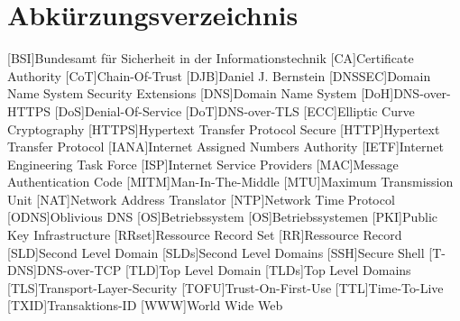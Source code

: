 \documentclass[Bachelor, BIC, german]{twbook}
\begin{document}
\chapter*{Abkürzungsverzeichnis}
\begin{acronym}[XXXXXX]
    [BSI]{Bundesamt für Sicherheit in der Informationstechnik}
    [CA]{Certificate Authority}
    [CoT]{Chain-Of-Trust}
    [DJB]{Daniel J. Bernstein}
    [DNSSEC]{Domain Name System Security Extensions}
    [DNS]{Domain Name System}
    [DoH]{DNS-over-HTTPS}
    [DoS]{Denial-Of-Service}
    [DoT]{DNS-over-TLS}
    [ECC]{Elliptic Curve Cryptography}
    [HTTPS]{Hypertext Transfer Protocol Secure}
    [HTTP]{Hypertext Transfer Protocol}
    [IANA]{Internet Assigned Numbers Authority}
    [IETF]{Internet Engineering Task Force}
    [ISP]{Internet Service Providers}
    [MAC]{Message Authentication Code}
    [MITM]{Man-In-The-Middle}
    [MTU]{Maximum Transmission Unit}
    [NAT]{Network Address Translator}
    [NTP]{Network Time Protocol}
    [ODNS]{Oblivious DNS}
    [OS]{Betriebssystem}
    [OS]{Betriebssystemen}
    [PKI]{Public Key Infrastructure}
    [RRset]{Ressource Record Set}
    [RR]{Ressource Record}
    [SLD]{Second Level Domain}
    [SLDs]{Second Level Domains}
    [SSH]{Secure Shell}
    [T-DNS]{DNS-over-TCP}
    [TLD]{Top Level Domain}
    [TLDs]{Top Level Domains}
    [TLS]{Transport-Layer-Security}
    [TOFU]{Trust-On-First-Use}
    [TTL]{Time-To-Live}
    [TXID]{Transaktions-ID}
    [WWW]{World Wide Web}
\end{acronym}

\lstset{ 
  basicstyle=\tiny\ttfamily,
  linewidth=14cm,
  xleftmargin=2cm
}




\end{document}
